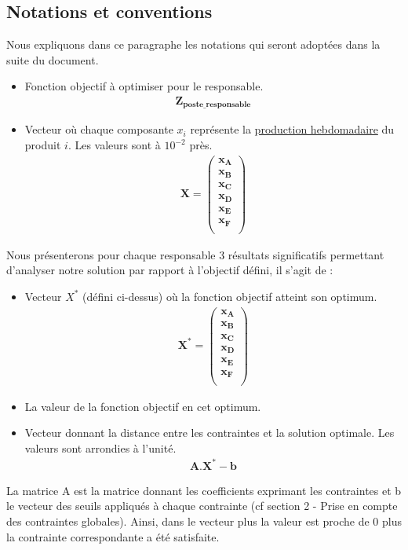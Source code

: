 \documentclass[12pt]{article}
\begin{document}
\subsection{Notations et conventions}
Nous expliquons dans ce paragraphe les notations qui seront adoptées dans la suite du document.
\begin{itemize}
\item Fonction objectif à optimiser pour le responsable.
\begin{align*} 
	\boldsymbol{Z_{poste\_responsable}}
\end{align*}
\item Vecteur où chaque composante $x_{i}$ représente la \underline{production hebdomadaire} du produit $i$. Les valeurs sont à $10^{-2}$ près.
\begin{align*} 
	\boldsymbol{X = 
   \left (
   \begin{array}{c}
      x_{A} \\
      x_{B} \\
      x_{C} \\
      x_{D} \\
      x_{E} \\
      x_{F} \\
   \end{array}
   \right )}
\end{align*}
\end{itemize}
Nous présenterons pour chaque responsable 3 résultats significatifs permettant d'analyser notre solution par rapport à l'objectif défini, il s'agit de :
\begin{itemize}
\item Vecteur $X^{*}$ (défini ci-dessus) où la fonction objectif atteint son optimum.
\begin{align*}
\boldsymbol{X^{*} = 
   \left (
   \begin{array}{c}
      x_{A} \\
      x_{B} \\
      x_{C} \\
      x_{D} \\
      x_{E} \\
      x_{F} \\
   \end{array}
   \right )}
 \end{align*}
 \item La valeur de la fonction objectif en cet optimum.
 \item Vecteur donnant la distance entre les contraintes et la solution optimale. Les valeurs sont arrondies à l'unité.
 \begin{align*} 
 \boldsymbol{A.X^{*}-b}
 \end{align*}
\end{itemize}
La matrice A est la matrice donnant les coefficients exprimant les contraintes et b le vecteur des seuils appliqués à chaque contrainte (cf section 2 - Prise en compte des contraintes globales). Ainsi, dans le vecteur plus la valeur est proche de 0 plus la contrainte correspondante a été satisfaite. 
\end{document}

